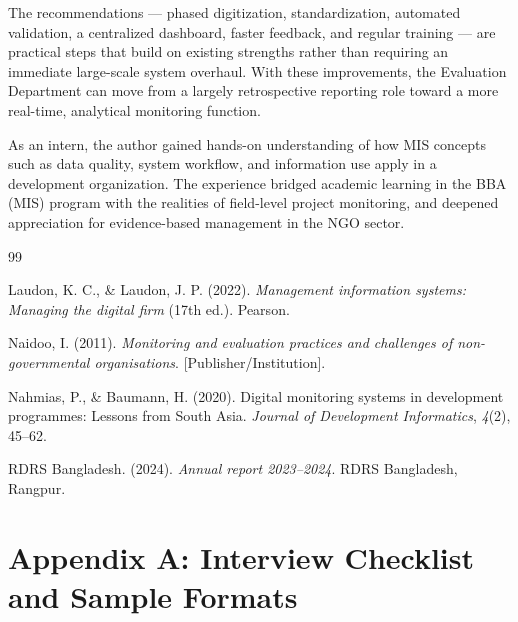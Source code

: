 \documentclass[12pt,a4paper]{report}
\begin{document}
The recommendations --- phased digitization, standardization, automated
validation, a centralized dashboard, faster feedback, and regular
training --- are practical steps that build on existing strengths
rather than requiring an immediate large-scale system overhaul. With
these improvements, the Evaluation Department can move from a largely
retrospective reporting role toward a more real-time, analytical
monitoring function.

As an intern, the author gained hands-on understanding of how MIS
concepts such as data quality, system workflow, and information use
apply in a development organization. The experience bridged academic
learning in the BBA (MIS) program with the realities of field-level
project monitoring, and deepened appreciation for evidence-based
management in the NGO sector.

\begin{thebibliography}{99}

Laudon, K. C., \& Laudon, J. P. (2022). \textit{Management information
systems: Managing the digital firm} (17th ed.). Pearson.

Naidoo, I. (2011). \textit{Monitoring and evaluation practices and
challenges of non-governmental organisations}. [Publisher/Institution].

Nahmias, P., \& Baumann, H. (2020). Digital monitoring systems in
development programmes: Lessons from South Asia. \textit{Journal of
Development Informatics}, \textit{4}(2), 45--62.

RDRS Bangladesh. (2024). \textit{Annual report 2023--2024}. RDRS
Bangladesh, Rangpur.

\end{thebibliography}

\appendix
\chapter{Appendix A: Interview Checklist and Sample Formats}
\end{document}
